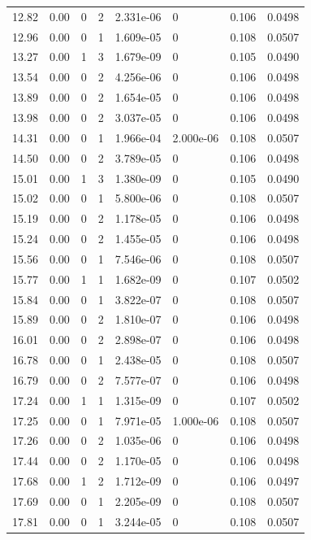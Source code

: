 \documentclass[preview]{standalone}
\begin{document}
{{{\begin{tabular}{L{1.2cm}C{1.2cm} C{0.3cm}C{0.5cm} C{1.4cm}C{1.4cm} C{1.4cm}C{1.4cm}}
  12.82  &  0.00  & 0     &  2 &  2.331e-06  & 0  & 0.106 &  0.0498   \\ 
  12.96  &  0.00  & 0     &  1 &  1.609e-05  & 0  & 0.108 &  0.0507   \\ 
  13.27  &  0.00  & 1     &  3 &  1.679e-09  & 0  & 0.105 &  0.0490   \\ 
  13.54  &  0.00  & 0     &  2 &  4.256e-06  & 0  & 0.106 &  0.0498   \\ 
  13.89  &  0.00  & 0     &  2 &  1.654e-05  & 0  & 0.106 &  0.0498   \\ 
  13.98  &  0.00  & 0     &  2 &  3.037e-05  & 0  & 0.106 &  0.0498   \\ 
  14.31  &  0.00  & 0     &  1 &  1.966e-04  & 2.000e-06  & 0.108 &  0.0507   \\ 
  14.50  &  0.00  & 0     &  2 &  3.789e-05  & 0  & 0.106 &  0.0498   \\ 
  15.01  &  0.00  & 1     &  3 &  1.380e-09  & 0  & 0.105 &  0.0490   \\ 
  15.02  &  0.00  & 0     &  1 &  5.800e-06  & 0  & 0.108 &  0.0507   \\ 
  15.19  &  0.00  & 0     &  2 &  1.178e-05  & 0  & 0.106 &  0.0498   \\ 
  15.24  &  0.00  & 0     &  2 &  1.455e-05  & 0  & 0.106 &  0.0498   \\ 
  15.56  &  0.00  & 0     &  1 &  7.546e-06  & 0  & 0.108 &  0.0507   \\ 
  15.77  &  0.00  & 1     &  1 &  1.682e-09  & 0  & 0.107 &  0.0502   \\ 
  15.84  &  0.00  & 0     &  1 &  3.822e-07  & 0  & 0.108 &  0.0507   \\ 
  15.89  &  0.00  & 0     &  2 &  1.810e-07  & 0  & 0.106 &  0.0498   \\ 
  16.01  &  0.00  & 0     &  2 &  2.898e-07  & 0  & 0.106 &  0.0498   \\ 
  16.78  &  0.00  & 0     &  1 &  2.438e-05  & 0  & 0.108 &  0.0507   \\ 
  16.79  &  0.00  & 0     &  2 &  7.577e-07  & 0  & 0.106 &  0.0498   \\ 
  17.24  &  0.00  & 1     &  1 &  1.315e-09  & 0  & 0.107 &  0.0502   \\ 
  17.25  &  0.00  & 0     &  1 &  7.971e-05  & 1.000e-06  & 0.108 &  0.0507   \\ 
  17.26  &  0.00  & 0     &  2 &  1.035e-06  & 0  & 0.106 &  0.0498   \\ 
  17.44  &  0.00  & 0     &  2 &  1.170e-05  & 0  & 0.106 &  0.0498   \\ 
  17.68  &  0.00  & 1     &  2 &  1.712e-09  & 0  & 0.106 &  0.0497   \\ 
  17.69  &  0.00  & 0     &  1 &  2.205e-09  & 0  & 0.108 &  0.0507   \\ 
  17.81  &  0.00  & 0     &  1 &  3.244e-05  & 0  & 0.108 &  0.0507   \\ 
\hline 
\end{tabular} 

}}}
\end{document}
